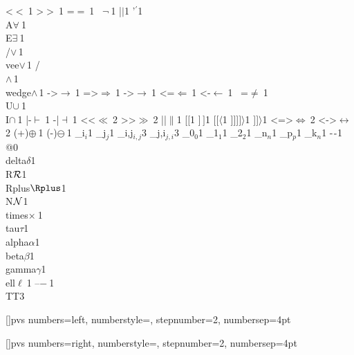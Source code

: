 {{{<}{{$<\ $}}1
        {>}{{$>\ $}}1
        {=}{{$=\ $}}1
        {~}{{$\neg\ $}}1
        {|}{{$\mid$}}1
        {'}{{$^\prime$}}1
{\\A}{{$\forall\ $}}1
        {\\E}{{$\exists\ $}}1
        {\\/}{{$\vee\,$}}1
        {\\vee}{{$\vee\,$}}1
        {/\\}{{$\wedge\,$}}1
        {\\wedge}{{$\wedge\,$}}1
        {->}{{$\rightarrow\ $}}1
        {=>}{{$\Rightarrow\ $}}1
        {->}{{$\rightarrow\ $}}1
        {<=}{{$\Leftarrow\ $}}1
        {<-}{{$\leftarrow\ $}}1
{~=}{{$\neq\ $}}1
        {\\U}{{$\cup\ $}}1
        {\\I}{{$\cap\ $}}1
        {|-}{{$\vdash\ $}}1
        {-|}{{$\dashv\ $}}1
        {<<}{{$\ll\ $}}2
        {>>}{{$\gg\ $}}2
        {||}{{$\|$}}1
{[}{{$[$}}1
        {]}{{$\,]$}}1
        {[[}{{$\langle$}}1
        {]]]}{{$]\rangle$}}1
        {]]}{{$\rangle$}}1
        {<=>}{{$\Leftrightarrow\ $}}2
        {<->}{{$\leftrightarrow\ $}}2
        {(+)}{{$\oplus\ $}}1
        {(-)}{{$\ominus\ $}}1
        {_i}{{$_{i}$}}1
        {_j}{{$_{j}$}}1
        {_{i,j}}{{$_{i,j}$}}3
        {_{j,i}}{{$_{j,i}$}}3
        {_0}{{$_0$}}1
        {_1}{{$_1$}}1
        {_2}{{$_2$}}1
        {_n}{{$_n$}}1
        {_p}{{$_p$}}1
        {_k}{{$_n$}}1
        {-}{{$\ms{-}$}}1
        {@}{{}}0
        {\\delta}{{$\delta$}}1
        {\\R}{{${\mathcal R}$}}1
        {\\Rplus}{{$\Rplus$}}1
        {\\N}{{${\mathcal N}$}}1
        {\\times}{{$\times\ $}}1
        {\\tau}{{$\tau$}}1
        {\\alpha}{{$\alpha$}}1
        {\\beta}{{$\beta$}}1
        {\\gamma}{{$\gamma$}}1
        {\\ell}{{$\ell\ $}}1
        {--}{{$-\ $}}1
        {\\TT}{{\hspace{1.5em}}}3
      }

[]{pvs}
{
  numbers=left,
  numberstyle=\tiny,
  stepnumber=2,
  numbersep=4pt
}

[]{pvs}
{
  numbers=right,
  numberstyle=\tiny,
  stepnumber=2,
  numbersep=4pt
}

}
